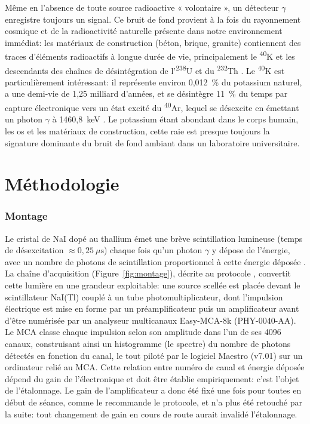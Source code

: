 \documentclass[11pt,letterpaper]{article}
\begin{document}
Même en l'absence de toute source radioactive « volontaire », un détecteur $\gamma$ enregistre toujours un signal. Ce bruit de fond provient à la fois du rayonnement cosmique et de la radioactivité naturelle présente dans notre environnement immédiat: les matériaux de construction (béton, brique, granite) contiennent des traces d'éléments radioactifs à longue durée de vie, principalement le \textsuperscript{40}K et les descendants des chaînes de désintégration de l'\textsuperscript{238}U et du \textsuperscript{232}Th \cite{unscear}. Le \textsuperscript{40}K est particulièrement intéressant: il représente environ 0,012~\% du potassium naturel, a une demi-vie de 1,25 milliard d'années, et se désintègre 11~\% du temps par capture électronique vers un état excité du \textsuperscript{40}Ar, lequel se désexcite en émettant un photon $\gamma$ à 1460,8~keV \cite{nndc}. Le potassium étant abondant dans le corps humain, les os et les matériaux de construction, cette raie est presque toujours la signature dominante du bruit de fond ambiant dans un laboratoire universitaire.

\section{Méthodologie}

\subsubsection*{Montage}
Le cristal de NaI dopé au thallium émet une brève scintillation lumineuse (temps de désexcitation $\approx 0{,}25~\mu\text{s}$) chaque fois qu'un photon $\gamma$ y dépose de l'énergie, avec un nombre de photons de scintillation proportionnel à cette énergie déposée \cite{protocole}. La chaîne d'acquisition (Figure~\ref{fig:montage}), décrite au protocole \cite{protocole}, convertit cette lumière en une grandeur exploitable: une source scellée est placée devant le scintillateur NaI(Tl) couplé à un tube photomultiplicateur, dont l'impulsion électrique est mise en forme par un préamplificateur puis un amplificateur avant d'être numérisée par un analyseur multicanaux Easy-MCA-8k (PHY-0040-AA). Le MCA classe chaque impulsion selon son amplitude dans l'un de ses 4096 canaux, construisant ainsi un histogramme (le spectre) du nombre de photons détectés en fonction du canal, le tout piloté par le logiciel Maestro (v7.01) sur un ordinateur relié au MCA. Cette relation entre numéro de canal et énergie déposée dépend du gain de l'électronique et doit être établie empiriquement: c'est l'objet de l'étalonnage. Le gain de l'amplificateur a donc été fixé une fois pour toutes en début de séance, comme le recommande le protocole, et n'a plus été retouché par la suite: tout changement de gain en cours de route aurait invalidé l'étalonnage.
\end{document}
